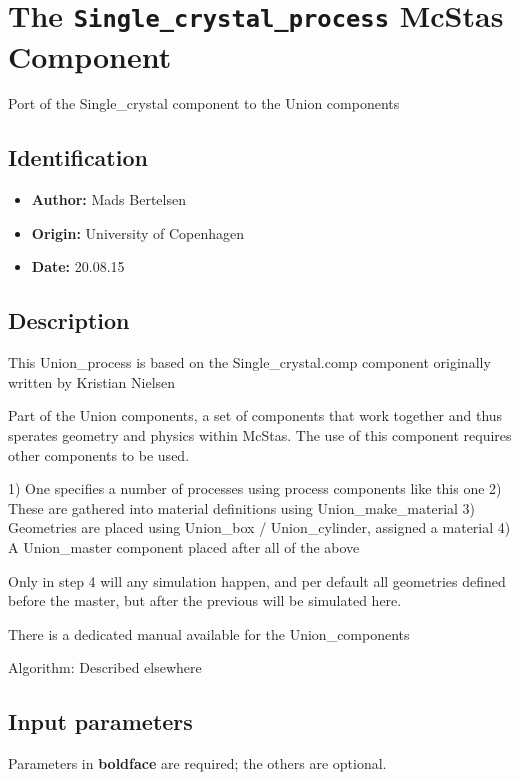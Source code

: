 \section{The \texttt{Single\_crystal\_process} McStas Component}
Port of the Single\_crystal component to the Union components

\subsection*{Identification}
\begin{itemize}
  \item \textbf{Author:} Mads Bertelsen
  \item \textbf{Origin:} University of Copenhagen
  \item \textbf{Date:} 20.08.15
\end{itemize}

\subsection*{Description}
This Union\_process is based on the Single\_crystal.comp component originally written by Kristian Nielsen

Part of the Union components, a set of components that work together and thus sperates geometry and physics within McStas. The use of this component requires other components to be used.

1) One specifies a number of processes using process components like this one 2) These are gathered into material definitions using Union\_make\_material 3) Geometries are placed using Union\_box / Union\_cylinder, assigned a material 4) A Union\_master component placed after all of the above

Only in step 4 will any simulation happen, and per default all geometries defined before the master, but after the previous will be simulated here.

There is a dedicated manual available for the Union\_components

Algorithm: Described elsewhere

\subsection*{Input parameters}
Parameters in \textbf{boldface} are required; the others are optional.


